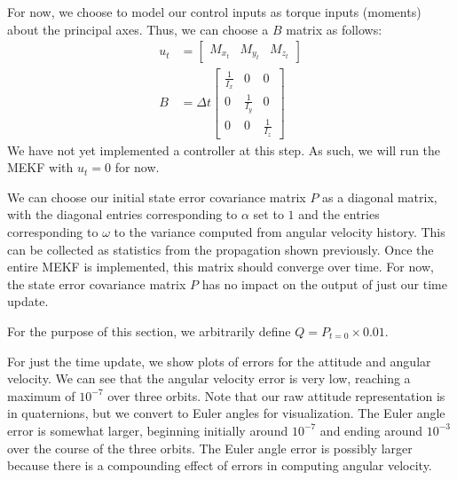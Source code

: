 For now, we choose to model our control inputs as torque inputs (moments) about the principal axes. Thus, we can choose a $B$ matrix as follows:
\begin{align*}
    u_{t} &= \begin{bmatrix}
        M_{x_{t}} & M_{y_{t}} & M_{z_{t}}
    \end{bmatrix} \\
    B &= \Delta t \begin{bmatrix}
        \frac{1}{I_{x}} & 0 & 0 \\
        0 & \frac{1}{I_{y}} & 0 \\
        0 & 0 & \frac{1}{I_{z}}
    \end{bmatrix}
\end{align*}
We have not yet implemented a controller at this step. As such, we will run the MEKF with $u_{t} = 0$ for now.

We can choose our initial state error covariance matrix $P$ as a diagonal matrix, with the diagonal entries corresponding to $\alpha$ set to $1$ and the entries corresponding to $\omega$ to the variance computed from angular velocity history. This can be collected as statistics from the propagation shown previously. Once the entire MEKF is implemented, this matrix should converge over time. For now, the state error covariance matrix $P$ has no impact on the output of just our time update.

For the purpose of this section, we arbitrarily define $Q = P_{t=0} \times 0.01$.

For just the time update, we show plots of errors for the attitude and angular velocity. We can see that the angular velocity error is very low, reaching a maximum of $10^{-7}$ over three orbits. Note that our raw attitude representation is in quaternions, but we convert to Euler angles for visualization. The Euler angle error is somewhat larger, beginning initially around $10^{-7}$ and ending around $10^{-3}$ over the course of the three orbits. The Euler angle error is possibly larger because there is a compounding effect of errors in computing angular velocity.

